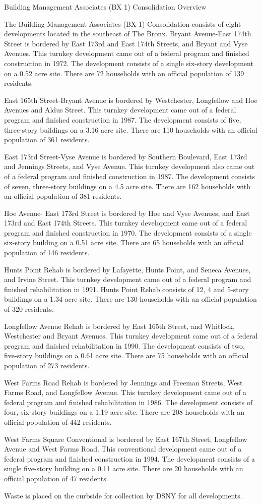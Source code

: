 Building Management Associates (BX 1) Consolidation Overview

The Building Management Associates (BX 1) Consolidation consists of eight developments located in the southeast of The Bronx. Bryant Avenue-East 174th Street is bordered by East 173rd and East 174th Streets, and Bryant and Vyse Avenues. This turnkey development came out of a federal program and finished construction in 1972. The development consists of a single six-story development on a 0.52 acre site. There are 72 households with an official population of 139 residents.

East 165th Street-Bryant Avenue is bordered by Westchester, Longfellow and Hoe Avenues and Aldus Street. This turnkey development came out of a federal program and finished construction in 1987. The development consists of five, three-story buildings on a 3.16 acre site. There are 110 households with an official population of 361 residents. 

East 173rd Street-Vyse Avenue is bordered by Southern Boulevard, East 173rd and Jennings Streets, and Vyse Avenue. This turnkey development also came out of a federal program and finished construction in 1987. The development consists of seven, three-story buildings on a 4.5 acre site. There are 162 households with an official population of 381 residents.

Hoe Avenue- East 173rd Street is bordered by Hoe and Vyse Avenues, and East 173rd and East 174th Streets. This turnkey development came out of a federal program and finished construction in 1970. The development consists of a single six-story building on a 0.51 acre site. There are 65 households with an official population of 146 residents.

Hunts Point Rehab is bordered by Lafayette, Hunts Point, and Seneca Avenues, and Irvine Street. This turnkey development came out of a federal program and finished rehabilitation in 1991. Hunts Point Rehab consists of 12, 4 and 5-story buildings on a 1.34 acre site. There are 130 households with an official population of 320 residents. 

Longfellow Avenue Rehab is bordered by East 165th Street, and Whitlock, Westchester and Bryant Avenues. This turnkey development came out of a federal program and finished rehabilitation in 1990. The development consists of two, five-story buildings on a 0.61 acre site. There are 75 households with an official population of 273 residents. 

West Farms Road Rehab is bordered by Jennings and Freeman Streets, West Farms Road, and Longfellow Avenue. This turnkey development came out of a federal program and finished rehabilitation in 1986. The development consists of four, six-story buildings on a 1.19 acre site. There are 208 households with an official population of 442 residents.

West Farms Square Conventional is bordered by East 167th Street, Longfellow Avenue and West Farms Road. This conventional development came out of a federal program and finished construction in 1994. The development consists of a single five-story building on a 0.11 acre site. There are 20 households with an official population of 47 residents.

Waste is placed on the curbside for collection by DSNY for all developments.